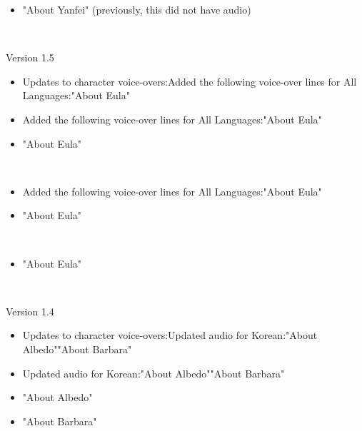 \documentclass[a4paper,12pt]{article}
\begin{document}
\begin{itemize}
\item "About Yanfei" (previously, this did not have audio)
\end{itemize}\\ \par \vspace{0.5cm}

Version 1.5\\ \par \vspace{0.5cm}

\begin{itemize}
\item Updates to character voice-overs:Added the following voice-over lines for All Languages:"About Eula"
\item Added the following voice-over lines for All Languages:"About Eula"
\item "About Eula"
\end{itemize}\\ \par \vspace{0.5cm}

\begin{itemize}
\item Added the following voice-over lines for All Languages:"About Eula"
\item "About Eula"
\end{itemize}\\ \par \vspace{0.5cm}

\begin{itemize}
\item "About Eula"
\end{itemize}\\ \par \vspace{0.5cm}

Version 1.4\\ \par \vspace{0.5cm}

\begin{itemize}
\item Updates to character voice-overs:Updated audio for Korean:"About Albedo""About Barbara"
\item Updated audio for Korean:"About Albedo""About Barbara"
\item "About Albedo"
\item "About Barbara"
\end{itemize}\\ \par \vspace{0.5cm}
\end{document}
